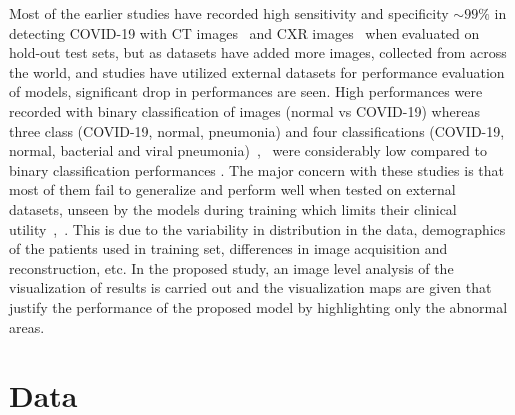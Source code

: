 \documentclass[10pt,journal,compsoc]{IEEEtran}
\begin{document}
Most of the earlier studies have recorded high sensitivity and specificity \begin{math}\sim99\%\end{math} in detecting COVID-19 with CT  images~\cite{ardakani2020application} and CXR images~\cite{zokaeinikoo2021aidcov} when evaluated on hold-out test sets, but as datasets have added more images, collected from across the world, and studies have utilized external datasets for performance evaluation of models, significant drop in performances are seen. High performances were recorded with binary classification of images (normal vs COVID-19) whereas three class (COVID-19, normal, pneumonia) and four classifications (COVID-19, normal, bacterial and viral pneumonia)~\cite{khan2020coronet},~\cite{mangal2020covidaid} were considerably low compared to binary classification performances . The major concern with these studies is that most of them fail to generalize and perform well when tested on external datasets, unseen by the models during training which limits their clinical utility~\cite{nguyen2021deep},~\cite{barish2021external}. This is due to the variability in distribution in the data, demographics of the patients used in training set, differences in image acquisition and reconstruction, etc. In the proposed study, an image level analysis of the visualization of results is carried out and the visualization maps are given that justify the performance of the proposed model by highlighting only the abnormal areas. 


\section{Data}
\end{document}

